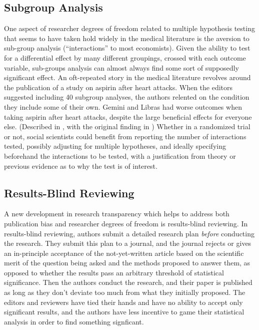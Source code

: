 \documentclass[12pt] {article}
\begin{document}
\subsection{Subgroup Analysis}
One aspect of researcher degrees of freedom related to multiple hypothesis testing that seems to have taken hold widely in the medical literature is the aversion to sub-group analysis (``interactions'' to
most economists). Given the ability to test for a differential effect by many different groupings, crossed with each outcome variable, sub-groups analysis can almost always find some sort of supposedly significant effect. An oft-repeated story in the medical literature revolves around the publication
of a study on aspirin after heart attacks. When the editors suggested including 40 subgroup analyses, the authors relented on the condition
they include some of their own. Gemini and Libras had worse outcomes
when taking aspirin after heart attacks, despite the large beneficial
effects for everyone else. (Described in \cite{schulz_multiplicity_2005},
with the original finding in \cite{isis-2_second_international_study_of_infarct_survival_collaborative_group_randomised_1988}) Whether in a randomized trial or
not, social scientists could benefit from reporting the number of
interactions tested, possibly adjusting for multiple hypotheses, and
ideally specifying beforehand the interactions to be tested, with a justification from theory or previous evidence as to why the test is of interest. 


\subsection{Results-Blind Reviewing}
A new development in research transparency which helps to address both publication bias and researcher degrees of freedom is results-blind reviewing. In results-blind reviewing, authors submit a detailed research plan \textit{before} conducting the research. They submit this plan to a journal, and the journal rejects or gives an in-principle acceptance of the not-yet-written article based on the scientific merit of the question being asked and the methods proposed to answer them, as opposed to whether the results pass an arbitrary threshold of statistical significance. Then the authors conduct the research, and their paper is published as long as they don't deviate too much from what they initially proposed. The editors and reviewers have tied their hands and have no ability to accept only significant results, and the authors have less incentive to game their statistical analysis in order to find something signficant. 
\end{document}

